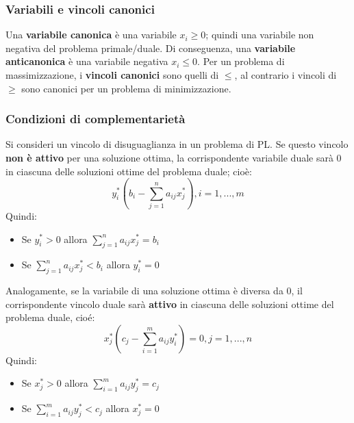 \documentclass[12pt]{article}
\begin{document}
\subsubsection{Variabili e vincoli canonici}
Una \textbf{variabile canonica} è una variabile $x_i \geq 0$; quindi una variabile non negativa del problema primale/duale.
Di conseguenza, una \textbf{variabile anticanonica} è una variabile negativa $x_i \leq 0$.
Per un problema di massimizzazione, i \textbf{vincoli canonici} sono quelli di $\leq$, al contrario i vincoli di $\geq$ sono canonici
per un problema di minimizzazione.
\subsubsection{Condizioni di complementarietà}
Si consideri un vincolo di disuguaglianza in un problema di PL. Se questo vincolo \textbf{non è attivo} per una soluzione ottima, la corrispondente
variabile duale sarà 0 in ciascuna delle soluzioni ottime del problema duale; cioè:
$$y_i^*(b_i - \sum_{j=1}^{n}a_{ij}x_j^*), i=1,...,m$$
Quindi:
\begin{itemize}
    \item Se $y_i^* > 0$ allora $\sum_{j=1}^{n} a_{ij}x_j^* = b_i$
    \item Se $\sum_{j=1}^{n} a_{ij}x_j^* < b_i$ allora $y_i^*=0$
\end{itemize}
Analogamente, se la variabile di una soluzione ottima è diversa da 0, il corrispondente vincolo duale sarà \textbf{attivo} in ciascuna delle soluzioni ottime del problema duale, cioé:
$$x_j^*(c_j - \sum_{i=1}^{m}a_{ij}y_i^*)=0, j=1,...,n$$
Quindi:
\begin{itemize}
    \item Se $x_j^* > 0$ allora $\sum_{i=1}^{m} a_{ij}y_j^* = c_j$
    \item Se $\sum_{i=1}^{m} a_{ij}y_j^* < c_j$ allora $x_j^* = 0$
\end{itemize}
\end{document}
